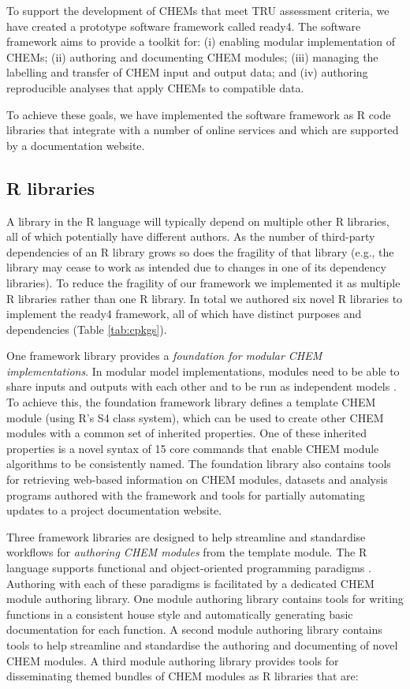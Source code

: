 \documentclass[sn-vancouver,Numbered,pdflatex]{sn-jnl}
\theoremstyle{remark}
\theoremstyle{definition}
\begin{document}
To support the development of CHEMs that meet TRU assessment criteria, we have created a prototype software framework called ready4. The software framework aims to provide a toolkit for: (i) enabling modular implementation of CHEMs; (ii) authoring and documenting CHEM modules; (iii) managing the labelling and transfer of CHEM input and output data; and (iv) authoring reproducible analyses that apply CHEMs to compatible data.

To achieve these goals, we have implemented the software framework as R \citep{RCORE2022} code libraries that integrate with a number of online services and which are supported by a documentation website.

\hypertarget{r-libraries}{%
\subsection{R libraries}\label{r-libraries}}

A library in the R language will typically depend on multiple other R libraries, all of which potentially have different authors. As the number of third-party dependencies of an R library grows so does the fragility of that library (e.g., the library may cease to work as intended due to changes in one of its dependency libraries). To reduce the fragility of our framework we implemented it as multiple R libraries rather than one R library. In total we authored six novel R libraries to implement the ready4 framework, all of which have distinct purposes and dependencies (Table \ref{tab:cpkgs}).

One framework library provides a \emph{foundation for modular CHEM implementations}. In modular model implementations, modules need to be able to share inputs and outputs with each other and to be run as independent models \citep{barros2023empowering}. To achieve this, the foundation framework library defines a template CHEM module (using R's S4 class system), which can be used to create other CHEM modules with a common set of inherited properties. One of these inherited properties is a novel syntax of 15 core commands that enable CHEM module algorithms to be consistently named. The foundation library also contains tools for retrieving web-based information on CHEM modules, datasets and analysis programs authored with the framework and tools for partially automating updates to a project documentation website.

Three framework libraries are designed to help streamline and standardise workflows for \emph{authoring CHEM modules} from the template module. The R language supports functional and object-oriented programming paradigms \citep{10.1214/13-STS452}. Authoring with each of these paradigms is facilitated by a dedicated CHEM module authoring library. One module authoring library contains tools for writing functions in a consistent house style and automatically generating basic documentation for each function. A second module authoring library contains tools to help streamline and standardise the authoring and documenting of novel CHEM modules. A third module authoring library provides tools for disseminating themed bundles of CHEM modules as R libraries that are:
\end{document}
